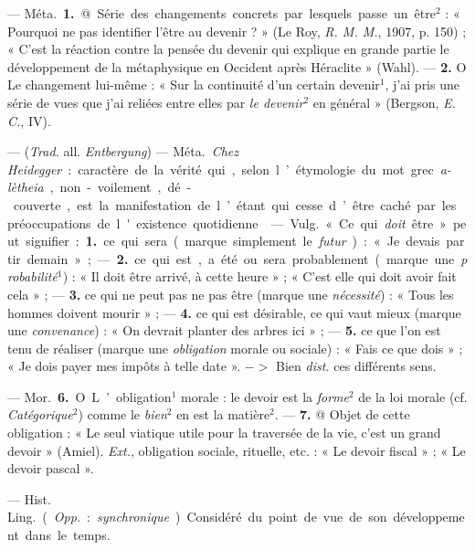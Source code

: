 \begin{itemize}[leftmargin=1cm, label=, itemsep=1pt]
 — \si{Méta.} {\bf 1.} @ Série des changements concrets par lesquels passe
un être$^2$ : « Pourquoi ne pas identifier l’être au devenir ? » (Le Roy,
{\it R. M. M.}, 1907, p. 150) ; « C’est la
réaction contre la pensée du devenir
qui explique en grande partie le
développement de la métaphysique
en Occident après Héraclite »
(Wahl). — {\bf 2.} O Le changement lui-même : « Sur la continuité d’un certain devenir$^1$, j'ai pris une série de
vues que j'ai reliées entre elles par
{\it le devenir}$^2$ en général » (Bergson,
{\it E. C.}, IV).

 — ({\it Trad.} all. {\it Entbergung})
— \si{Méta.} {\it Chez Heidegger} : caractère
de la vérité qui, selon l’étymologie
du mot grec {\it a-lètheia}, non-voilement, dé-couverte, est la manifestation de l’étant qui cesse d’être
caché par les préoccupations de
l'existence quotidienne.

 — \si{Vulg.} « Ce qui {\it doit}
être » peut signifier : {\bf 1.} ce qui sera
(marque simplement le {\it futur}) : « Je
devais partir demain » ; — {\bf 2.} ce qui
est, a été ou sera probablement
(marque une {\it probabilité}$^1$) : « Il doit
être arrivé, à cette heure » ; « C’est
elle qui doit avoir fait cela » ; — {\bf 3.} ce
qui ne peut pas ne pas être (marque
une {\it nécessité}) : « Tous les hommes
doivent mourir » ; — {\bf 4.} ce qui est
désirable, ce qui vaut mieux (marque
une {\it convenance}) : « On devrait
planter des arbres ici » ; — {\bf 5.} ce que
l’on est tenu de réaliser (marque une
{\it obligation} morale ou sociale) : « Fais
ce que dois » ; « Je dois payer mes
impôts à telle date ». $->$ Bien {\it dist.}
ces différents sens.

 — \si{Mor.} {\bf 6.} O L’obligation$^1$ morale : le devoir est la {\it forme}$^2$
de la loi morale (cf. {\it Catégorique}$^2$)
comme le {\it bien}$^2$ en est la matière$^2$. —
 {\bf 7.} @ Objet de cette obligation : « Le
seul viatique utile pour la traversée
de la vie, c’est un grand devoir »
(Amiel). {\it Ext.}, obligation sociale,
rituelle, etc. : « Le devoir fiscal » ;
« Le devoir pascal ».

 — \si{Hist. Ling.} ({\it Opp.} : {\it synchronique}).
Considéré du point de vue de son développement dans le temps.


\end{itemize}
